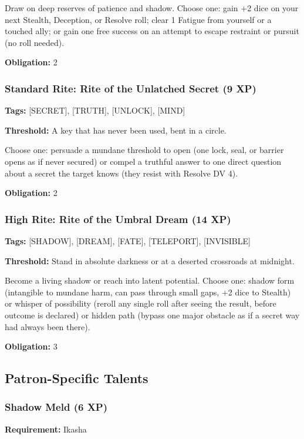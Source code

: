 Draw on deep reserves of patience and shadow. Choose one: gain +2 dice on your next Stealth, Deception, or Resolve roll; clear 1 Fatigue from yourself or a touched ally; or gain one free success on an attempt to escape restraint or pursuit (no roll needed).

\textbf{Obligation:} 2

\subsubsection{Standard Rite: Rite of the Unlatched Secret (9 XP)}

\textbf{Tags:} [SECRET], [TRUTH], [UNLOCK], [MIND]

\textbf{Threshold:} A key that has never been used, bent in a circle.

Choose one: persuade a mundane threshold to open (one lock, seal, or barrier opens as if never secured) or compel a truthful answer to one direct question about a secret the target knows (they resist with Resolve DV 4).

\textbf{Obligation:} 2

\subsubsection{High Rite: Rite of the Umbral Dream (14 XP)}

\textbf{Tags:} [SHADOW], [DREAM], [FATE], [TELEPORT], [INVISIBLE]

\textbf{Threshold:} Stand in absolute darkness or at a deserted crossroads at midnight.

Become a living shadow or reach into latent potential. Choose one: shadow form (intangible to mundane harm, can pass through small gaps, +2 dice to Stealth) or whisper of possibility (reroll any single roll after seeing the result, before outcome is declared) or hidden path (bypass one major obstacle as if a secret way had always been there).

\textbf{Obligation:} 3

\subsection{Patron-Specific Talents}

\subsubsection{Shadow Meld (6 XP)}

\textbf{Requirement:} Ikasha

